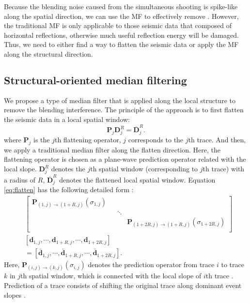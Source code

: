 Because the blending noise caused from the simultaneous shooting is spike-like along the spatial direction, we can use the MF to effectively remove . However, the traditional MF is only applicable to those seismic data that  composed of horizontal reflections, otherwise much useful reflection energy will be damaged. Thus, we need to either find a way to flatten the seismic data or apply the MF along the structural direction.  

\subsection{Structural-oriented median filtering}
We propose a type of median filter that is applied along the local structure to remove the blending interference. The principle of the approach is to first flatten the seismic data in a local spatial window:
\begin{equation}
\label{eq:flatten}
 \mathbf{P}_j \mathbf{D}_j^R= \overline{\mathbf{D}}_j^R.
\end{equation}
where $\mathbf{P}_j$ is the $j$th flattening operator,  $j$ corresponds to the $j$th trace. And then, we apply a traditional median filter along the flatten direction. Here, the flattening operator is chosen as a plane-wave prediction operator related with the local slope. $\mathbf{D}_j^R$ denotes the $j$th spatial window (corresponding to $j$th trace) with a radius of $R$, $\overline{\mathbf{D}}_j^R$ denotes the flattened local spatial window.
Equation \ref{eq:flatten} has the following detailed form \cite[]{shuwei2015}:
\begin{equation}
\label{eq:detail}
\begin{split}
& \left[
\begin{array}{cccccc}
\mathbf{P}_{(1,j)\rightarrow(1+R,j)}(\sigma_{1,j}) &  & & \\
 &  & \ddots & \\
 &  & & \mathbf{P}_{(1+2R,j)\rightarrow(1+R,j)}(\sigma_{1+2R,j})\\
\end{array}
\right]\\
&[\mathbf{d}_{1,j},\cdots,\mathbf{d}_{1+R,j}, \cdots, \mathbf{d}_{1+2R,j}]\\
&=[\overline{\mathbf{d}}_{1,j},\cdots,\overline{\mathbf{d}}_{1+R,j}, \cdots, \overline{\mathbf{d}}_{1+2R,j}]. 
\end{split}
\end{equation}
Here, $\mathbf{P}_{(i,j)\rightarrow(k,j)}(\sigma_{i,j})$ denotes the prediction operator from trace $i$ to trace $k$ in $j$th spatial window, which is connected with the local slope of $i$th trace .  Prediction of a trace consists of shifting the original trace along dominant event slopes \cite[]{fomel2010painting}.  
